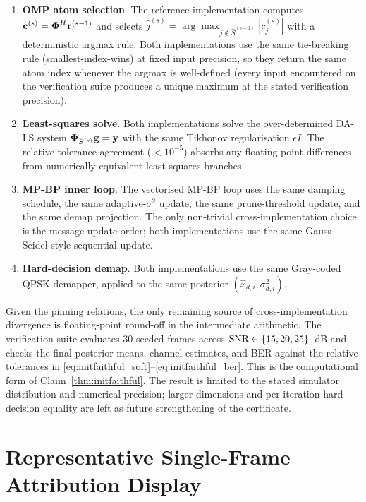 \begin{enumerate}[leftmargin=*,itemsep=1pt]
  \item \textbf{OMP atom selection}. The reference implementation computes
        $\mathbf{c}^{(s)}=\boldsymbol{\Phi}^H\mathbf{r}^{(s-1)}$ and selects
        $\hat{j}^{(s)}=\arg\max_{j\notin\hat{S}^{(s-1)}}|c_j^{(s)}|$ with
        a deterministic argmax rule. Both implementations use the same
        tie-breaking rule (smallest-index-wins) at fixed input
        precision, so they return the same atom index whenever the
        argmax is well-defined (every input encountered on the
        verification suite produces a unique maximum at the stated
        verification precision).
  \item \textbf{Least-squares solve}. Both implementations solve the
        over-determined DA-LS system $\boldsymbol{\Phi}_{\hat{S}^{(s)}} \mathbf{g} = \mathbf{y}$
        with the same Tikhonov regularisation $\epsilon I$.
        The relative-tolerance agreement ($ < 10^{-5}$) absorbs any
        floating-point differences from numerically equivalent
        least-squares branches.
  \item \textbf{MP-BP inner loop}. The vectorised MP-BP loop uses the same
        damping schedule, the same adaptive-$\sigma^2$ update, the same
        prune-threshold update, and the same demap projection. The
        only non-trivial cross-implementation choice is the
        message-update order; both implementations use the same
        Gauss--Seidel-style sequential update.
  \item \textbf{Hard-decision demap}. Both implementations use the same
        Gray-coded QPSK demapper, applied to the same posterior
        $(\hat{x}_{d,i},\sigma_{d,i}^2)$.
\end{enumerate}

Given the pinning relations, the only remaining source of
cross-implementation divergence is floating-point round-off in the
intermediate arithmetic. The verification suite evaluates 30 seeded
frames across $\mathrm{SNR}\in\{15,20,25\}$~dB and checks the final posterior
means, channel estimates, and BER against the relative tolerances in
\eqref{eq:initfaithful_soft}--\eqref{eq:initfaithful_ber}. This is the
computational form of Claim~\ref{thm:initfaithful}. The result is
limited to the stated simulator distribution and numerical precision;
larger dimensions and per-iteration hard-decision equality are left as
future strengthening of the certificate.

\section{Representative Single-Frame Attribution Display}
\label{app:singleframe}

